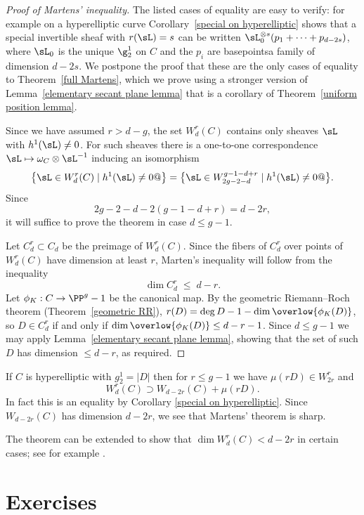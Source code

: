 \begin{proof}[Proof of Martens' inequality]
 The listed cases of equality are easy to verify: for example on a hyperelliptic curve Corollary~\ref{special on hyperelliptic} shows that a special invertible sheaf with  $r(\sL) = s$ can be written $\sL_0^{\otimes s}(p_1+\cdots + p_{d-2s})$, where
$\sL_0$ is the unique $\g^1_2$ on $C$ and the $p_i$ are basepoints\emdash a family of dimension $d-2s$.
We postpone the proof that these are the only cases of equality to Theorem~\ref{full Martens}, which we prove
using a stronger version of Lemma~\ref{elementary secant plane lemma} that is a corollary of Theorem~\ref{uniform position lemma}.

Since we have assumed $r>d-g$, the set $W^r_d(C)$ contains only  sheaves
 $\sL$ with $h^1(\sL)\neq 0$. For such sheaves there is a one-to-one
correspondence $\sL \mapsto \omega_C\otimes \sL^{-1}$ inducing an isomorphism
$$
\bigl\{\sL \in W^r_d(C) \mid h^1(\sL) \neq 0 @\bigr\}= \bigl\{\sL \in W^{g-1-d+r}_{2g-2-d} \mid h^1(\sL) \neq 0 @\bigl\}
.
$$
Since
$$
2g-2-d - 2(g-1-d+r) = d-2r,
$$
it will suffice to prove the theorem in case $d \leq g-1$.

Let $C^r_d\subset C_d$ be the preimage of $W^r_d(C)$. Since the fibers of $C^r_d$ over points of
$W^r_d(C)$ have dimension at least $r$, Marten's inequality will follow from the inequality
$$
\dim C^r_d \; \leq \; d-r.
$$
\meshing
Let $\phi_K: C\to \PP^g-1$ be the canonical map. By the
geometric Riemann--Roch theorem
%
%
(Theorem~\ref{geometric RR}),
$r(D) = \deg D -1 -\dim\overlow{\phi_K(D)}$,
so $D\in C^r_d$ if and only if
$\dim \overlow{\phi_K(D)}\leq d-r-1$. Since $d\leq g-1$ we may apply  Lemma~\ref{elementary secant plane lemma}, showing that the set of such $D$ has dimension $\leq d-r$, as required.
\end{proof}


If $C$ is hyperelliptic with $g^1_2 = |D|$ then for $r\leq g-1$ we have $\mu(rD) \in W^r_{2r}$ and
$$
W^r_d(C) \supset W_{d-2r}(C) + \mu(rD).
$$
In fact this is an equality by
Corollary
\ref{special on hyperelliptic}.
Since $W_{d-2r}(C)$ has dimension $d-2r$, we see that Martens' theorem is sharp.

The theorem can be extended to show
%
that $\dim W^r_d(C) < d-2r$ in certain cases;
see for example \cite{Mumford-Prym1,Keem,Coppens}.

\section{Exercises}

